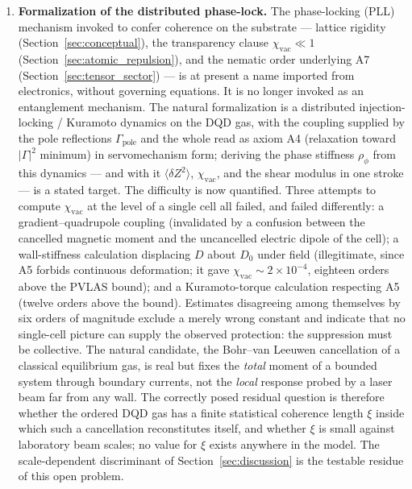 \documentclass[11pt,a4paper]{article}
\theoremstyle{plain}
\theoremstyle{remark}
\begin{document}
\begin{enumerate}
    \item \textbf{Formalization of the distributed phase-lock.} The phase-locking (PLL) mechanism invoked to confer coherence on the substrate --- lattice rigidity (Section~\ref{sec:conceptual}), the transparency clause $\chi_{\text{vac}}\ll1$ (Section~\ref{sec:atomic_repulsion}), and the nematic order underlying A7 (Section~\ref{sec:tensor_sector}) --- is at present a name imported from electronics, without governing equations. It is no longer invoked as an entanglement mechanism. The natural formalization is a distributed injection-locking / Kuramoto dynamics on the DQD gas, with the coupling supplied by the pole reflections $\Gamma_{\text{pole}}$ and the whole read as axiom A4 (relaxation toward $|\Gamma|^2$ minimum) in servomechanism form; deriving the phase stiffness $\rho_\phi$ from this dynamics --- and with it $\langle\delta Z^2\rangle$, $\chi_{\text{vac}}$, and the shear modulus in one stroke --- is a stated target. The difficulty is now quantified. Three attempts to compute $\chi_{\text{vac}}$ at the level of a single cell all failed, and failed differently: a gradient--quadrupole coupling (invalidated by a confusion between the cancelled magnetic moment and the uncancelled electric dipole of the cell); a wall-stiffness calculation displacing $D$ about $D_0$ under field (illegitimate, since A5 forbids continuous deformation; it gave $\chi_{\text{vac}} \sim 2\times10^{-4}$, eighteen orders above the PVLAS bound); and a Kuramoto-torque calculation respecting A5 (twelve orders above the bound). Estimates disagreeing among themselves by six orders of magnitude exclude a merely wrong constant and indicate that no single-cell picture can supply the observed protection: the suppression must be collective. The natural candidate, the Bohr--van Leeuwen cancellation of a classical equilibrium gas, is real but fixes the \emph{total} moment of a bounded system through boundary currents, not the \emph{local} response probed by a laser beam far from any wall. The correctly posed residual question is therefore whether the ordered DQD gas has a finite statistical coherence length $\xi$ inside which such a cancellation reconstitutes itself, and whether $\xi$ is small against laboratory beam scales; no value for $\xi$ exists anywhere in the model. The scale-dependent discriminant of Section~\ref{sec:discussion} is the testable residue of this open problem.

\end{enumerate}
\end{document}
